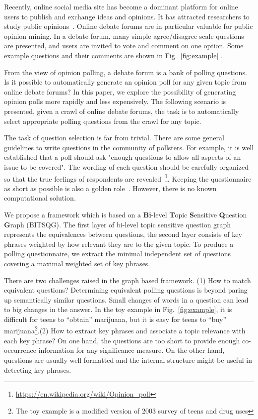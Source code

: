 \documentclass{llncs}
\begin{document}
Recently, online social media site has become a dominant platform for online users to publish and exchange ideas and opinions. It has attracted researchers to study public opinions~\cite{OConnor2010tweets,Lampos2013user}. Online debate forums are in particular valuable for public opinion mining. In a debate forum, many simple agree/disagree scale questions are presented, and users are invited to vote and comment on one option. Some example questions and their comments are shown in Fig.~\ref{fig:example} .


From the view of opinion polling, a debate forum is a bank of polling questions. Is it possible to automatically generate an opinion poll for any given topic from online debate forums? In this paper, we explore the possibility of generating opinion polls more rapidly and less expensively. The following scenario is presented, given a crawl of online debate forums, the task is to automatically select appropriate polling questions from the crawl for any topic.

The task of question selection is far from trivial. There are some general guidelines to write questions in the community of pollsters. For example, it is well established that a poll should ask "enough questions to allow all aspects of an issue to be covered". The wording of each question should be carefully organized so that the true feelings of respondents are revealed~\footnote{\url{https://en.wikipedia.org/wiki/Opinion_poll}}. Keeping the questionnaire as short as possible is also a golden role~\cite{Trochim2000Research}. However, there is no known computational solution.


We propose a framework which is based on a \textbf{Bi}-level \textbf{T}opic \textbf{S}ensitive \textbf{Q}uestion \textbf{G}raph (BITSQG). The first layer of bi-level topic sensitive question graph represents the equivalences between questions, the second layer consists of key phrases weighted by how relevant they are to the given topic. To produce a polling questionnaire, we extract the minimal independent set of questions covering a maximal weighted set of key phrases.


There are two challenges raised in the graph based framework. (1) How to match equivalent questions? Determining equivalent polling questions is beyond paring up semantically similar questions. Small changes of words in a question can lead to big changes in the answer. In the toy example in Fig.~\ref{fig:example}, it is difficult for teens to ``obtain'' marijuana, but it is easy for teens to ``buy'' marijuana\footnote{The toy example is a modified version of 2003 survey of teens and drug uses}.(2) How to extract key phrases and associate a topic relevance with each key phrase? On one hand, the questions are too short to provide enough co-occurrence information for any significance measure. On the other hand, questions are usually well formatted and the internal structure might be useful in detecting key phrases.
\end{document}
